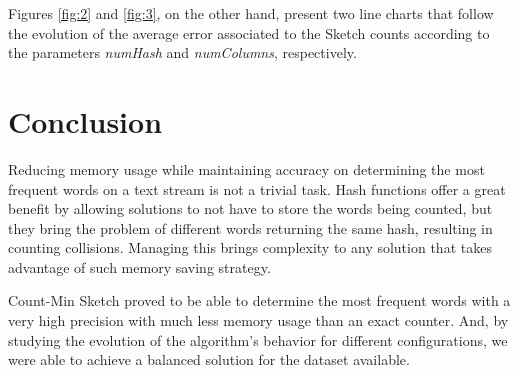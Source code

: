 \documentclass[shortpaper]{revdetua}
\begin{document}
Figures \ref{fig:2} and \ref{fig:3}, on the other hand, present two line charts that follow the evolution of the average error associated to the Sketch counts 
according to the parameters \textit{numHash} and \textit{numColumns}, respectively.






\section{Conclusion}

Reducing memory usage while maintaining accuracy on determining the most frequent words on a text stream is not a trivial task.
Hash functions offer a great benefit by allowing solutions to not have to store the words being counted, but they bring the problem of different words 
returning the same hash, resulting in counting collisions.
Managing this brings complexity to any solution that takes advantage of such memory saving strategy.

Count-Min Sketch proved to be able to determine the most frequent words with a very high precision with much less memory usage than an exact counter.
And, by studying the evolution of the algorithm's behavior for different configurations, we were able to achieve a balanced solution for the dataset available.
\end{document}
